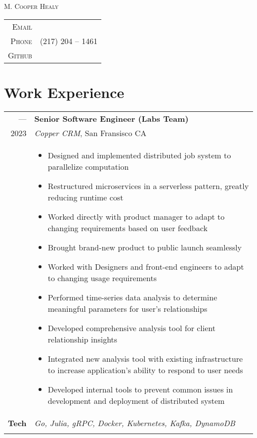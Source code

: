\documentclass[a4paper,10pt]{article}
\newcommand{\lmline}[1]{%
  \uline{\phantom{#1}}%
  \llap{\contour{white}{#1}}%
}
\newcommand{\br}{\\\multicolumn{2}{c}{}}
\begin{document}
\pagestyle{empty}

\par{\centering
    {\Huge \textsc{M. Cooper Healy}
}\bigskip\par}

\begin{center}
\begin{tabular}{rl}
    \textsc{Email }        & \lmline{m.cooper.healy@gmail.com} \\
    \textsc{Phone }        & (217) 204 -- 1461  \\
    \textsc{Github }       & \lmline{https://github.com/noonels} \\
\end{tabular}
\end{center}
\section{Work Experience}
\begin{tabular}{r|p{15cm}}
  \textsc{---}  & \textbf{Senior Software Engineer (Labs Team)} \\
  \textsc{2023} & \textit{Copper CRM}, San Fransisco CA
  \\ &  
       \begin{itemize}
       \item Designed and implemented distributed job system to parallelize computation
       \item Restructured microservices in a serverless pattern, greatly reducing runtime cost
       \item Worked directly with product manager to adapt to changing requirements based on user feedback
       \item Brought brand-new product to public launch seamlessly
       \item Worked with Designers and front-end engineers to adapt to changing usage requirements
       \item Performed time-series data analysis to determine meaningful parameters for user's relationships
       \item Developed comprehensive analysis tool for client relationship insights
       \item Integrated new analysis tool with existing infrastructure to increase application's ability to respond to user needs
       \item Developed internal tools to prevent common issues in development and deployment of distributed system
       \end{itemize} \\
  \textbf{Tech} & \textit{Go, Julia, gRPC, Docker, Kubernetes, Kafka, DynamoDB} \br \\
\end{tabular}
\end{document}
